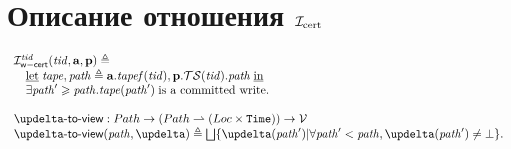 \section{Описание отношения $\mathcal{I}_{\textup{\rm cert}}$}

\[\begin{array}{l}
\invTidWriteComCERT(\tId, \aT, \p) \triangleq \\
\quad \textLet \tape, \cpath \triangleq \aT.\tapef(\tId), \p.\TSfprom(\tId).\cpath \; \textIn \\
\quad \exists \cpath' \ge \cpath. \tape(\cpath') \; \text{is a committed write}. \\
\\
\deltaToView : \Path \rightarrow (\Path \rightharpoonup (\Loc \times \Timestamp)) \rightarrow \View \\
\deltaToView(\cpath, \delta) \triangleq \bigsqcup \{ \delta(\cpath') | \forall \cpath' < \cpath, \delta(\cpath') \not = \bot \}. \\
\end{array}\]

